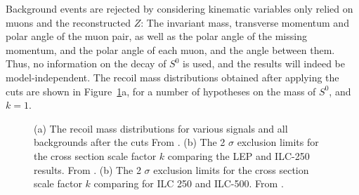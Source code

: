 Background events are rejected by considering kinematic variables
only relied on muons and the reconstructed $Z$:
The invariant mass, transverse momentum and polar angle of the muon pair,
as well as the polar angle of the missing momentum,
and the polar angle of each muon, and the angle between them.
Thus, no information on the decay of $S^0$ is used,
and the results will indeed be model-independent.
The recoil mass distributions obtained after applying the cuts
are shown in Figure~\ref{fig:searches_newscalars}a, 
for a number of hypotheses
on the mass of $S^0$, and $k=1$.
\begin{figure}[]
\setlength{\unitlength}{1.0cm}
\hspace{0.0\linewidth}
\hspace{0.0\linewidth}
\caption{\label{fig:searches_newscalars} (a) The recoil mass distributions for various signals
and all backgrounds after the cuts From \cite{yanichep}.
(b) The 2 $\sigma$ exclusion limits for the cross section scale factor $k$ comparing the LEP and
ILC-250 results. From \cite{yanichep}.
(b) The 2 $\sigma$ exclusion limits for the cross section scale factor $k$ comparing for ILC 250 and ILC-500. From \cite{yanlcws18}.}
\end{figure}

